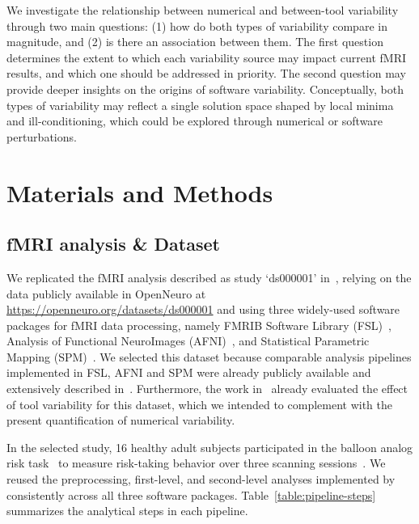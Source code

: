 \documentclass[conference]{IEEEtran}
\begin{document}
We investigate the relationship between numerical and between-tool
variability through two main questions: (1) how do both types of
variability compare in magnitude, and (2) is there an association between
them. The first question determines the extent to which each variability
source may impact current fMRI results, and which one should be addressed
in priority. The second question may provide deeper insights on the origins
of software variability. Conceptually, both types of variability may
reflect a single solution space shaped by local minima and
ill-conditioning, which could be explored through numerical or software
perturbations.


\section{Materials and Methods}

\subsection{fMRI analysis \& Dataset}

We replicated the fMRI analysis described as study `ds000001'
in~\cite{schonberg2012decreasing}, relying on the data publicly available
in OpenNeuro at \url{https://openneuro.org/datasets/ds000001} and using
three widely-used software packages for fMRI data processing, namely FMRIB
Software Library (FSL)~\cite{jenkinson2012fsl}, Analysis of Functional
NeuroImages (AFNI)~\cite{cox1996afni}, and Statistical Parametric
Mapping (SPM)~\cite{penny2011statistical}. We selected this dataset because
comparable analysis pipelines implemented in FSL, AFNI and SPM were already 
publicly available and extensively described in~\cite{bowring2019exploring}.
Furthermore, the work in~\cite{bowring2019exploring} already evaluated the
effect of tool variability for this dataset, which we intended to
complement with the present quantification of numerical variability.

In the selected study, 16 healthy adult subjects participated in the
balloon analog risk task~\cite{lejuez2002evaluation} to measure risk-taking
behavior over three scanning sessions~\cite{schonberg2012decreasing}. We
reused the preprocessing, first-level, and second-level analyses
implemented by~\cite{bowring2019exploring} consistently across all three
software packages. Table~\ref{table:pipeline-steps} summarizes the analytical steps in each
pipeline.
\end{document}
